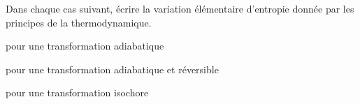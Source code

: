 \debutEntrainement

Dans chaque cas suivant, écrire la variation élémentaire d'entropie donnée par les principes de la thermodynamique.

\minusSmallskip

\begin{enonce}
pour une transformation adiabatique
\end{enonce}




\begin{enonce}
pour une transformation adiabatique et réversible
\end{enonce}




\begin{enonce}
pour une transformation isochore
\end{enonce}




\finEntrainement



\minusSmallskip



